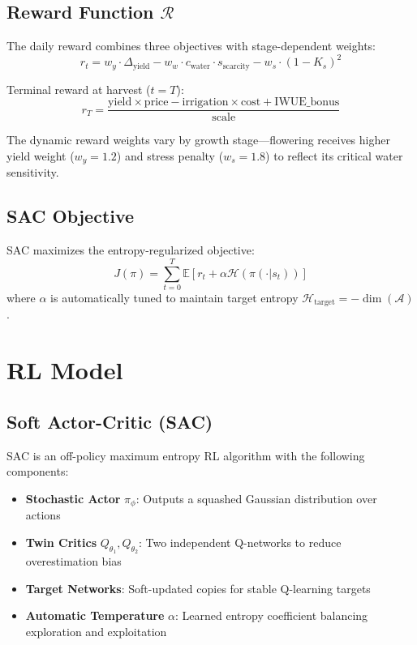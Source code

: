 \documentclass[12pt, a4paper]{article}
\begin{document}
\subsection{Reward Function $\mathcal{R}$}
The daily reward combines three objectives with stage-dependent weights:
\begin{equation}
    r_t = w_y \cdot \Delta_{\text{yield}} - w_w \cdot c_{\text{water}} \cdot s_{\text{scarcity}} - w_s \cdot (1 - K_s)^2
\end{equation}

Terminal reward at harvest ($t = T$):
\begin{equation}
    r_T = \frac{\text{yield} \times \text{price} - \text{irrigation} \times \text{cost} + \text{IWUE\_bonus}}{\text{scale}}
\end{equation}

The dynamic reward weights vary by growth stage---flowering receives higher yield weight ($w_y = 1.2$) and stress penalty ($w_s = 1.8$) to reflect its critical water sensitivity.

\subsection{SAC Objective}
SAC maximizes the entropy-regularized objective:
\begin{equation}
    J(\pi) = \sum_{t=0}^{T} \mathbb{E}\left[r_t + \alpha \mathcal{H}(\pi(\cdot|s_t))\right]
\end{equation}
where $\alpha$ is automatically tuned to maintain target entropy $\mathcal{H}_{\text{target}} = -\dim(\mathcal{A})$.

\section{RL Model}

\subsection{Soft Actor-Critic (SAC)}
SAC is an off-policy maximum entropy RL algorithm with the following components:
\begin{itemize}
    \item \textbf{Stochastic Actor} $\pi_\phi$: Outputs a squashed Gaussian distribution over actions
    \item \textbf{Twin Critics} $Q_{\theta_1}, Q_{\theta_2}$: Two independent Q-networks to reduce overestimation bias
    \item \textbf{Target Networks}: Soft-updated copies for stable Q-learning targets
    \item \textbf{Automatic Temperature} $\alpha$: Learned entropy coefficient balancing exploration and exploitation
\end{itemize}
\end{document}
